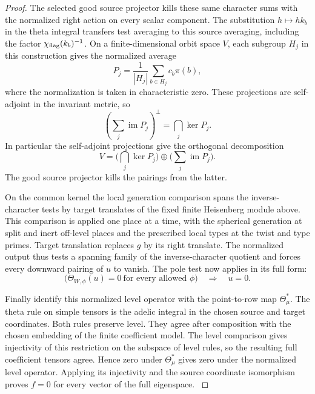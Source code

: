 \begin{proof}
The selected good source projector kills these same
character sums with the normalized right action on
every scalar component. The substitution
\(h\mapsto hk_b\) in the theta integral transfers test
averaging to this source averaging, including the factor
\(\chi_{\rm flag}(k_b)^{-1}\). On a finite-dimensional orbit space \(V\), each subgroup \(H_j\) in this construction gives the normalized average
\[
 P_j=\frac1{|H_j|}\sum_{b\in H_j}c_b\pi(b),
\]
where the normalization is taken in characteristic zero. These projections
are self-adjoint in the invariant metric, so
\[
              \left(\sum_j\operatorname{im}P_j\right)^\perp
                            =\bigcap_j\ker P_j .
\]
In particular the self-adjoint projections give the orthogonal decomposition
\[
 V=\biggl(\bigcap_j\ker P_j\biggr)\oplus\biggl(\sum_j\operatorname{im}P_j\biggr).
\]
The good source
projector kills the pairings from the latter.

On the common kernel the local generation comparison
spans the inverse-character tests by target translates of
the fixed finite Heisenberg module above. This comparison
is applied one place at a time, with the spherical
generation at split and inert off-level places and the
prescribed local types at the twist and type primes.
Target translation replaces \(g\) by its right translate.
The normalized output thus tests a spanning family of the
inverse-character quotient and forces every downward
pairing of \(u\) to vanish. The pole test now applies in its full form:
\[
 \bigl(\Theta_{W,\phi}(u)=0\ \text{for every allowed }\phi\bigr)\quad\Longrightarrow\quad u=0.
\]

\label{cor:selected-point-adjoint-5}

Finally identify this normalized level operator with the
point-to-row map \(\Theta_\mu^*\). The theta rule on simple
tensors is the adelic integral in the chosen source and
target coordinates. Both rules preserve level. They agree
after composition with the chosen embedding of the finite
coefficient model. The level comparison gives injectivity
of this restriction on the subspace of level rules, so the
resulting full coefficient tensors agree. Hence zero under
\(\Theta_\mu^*\) gives zero under the normalized level
operator. Applying its injectivity and the source coordinate isomorphism
proves \(f=0\) for every vector of the full eigenspace.
\label{cor:selected-point-adjoint-6}
\end{proof}
